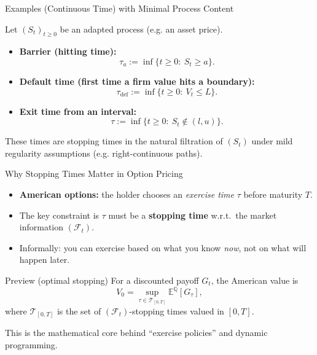 \documentclass[10pt,aspectratio=169]{beamer}
\begin{document}
\begin{frame}{Examples (Continuous Time) with Minimal Process Content}

Let \((S_t)_{t\ge 0}\) be an adapted process (e.g. an asset price).\pause

\begin{itemize}
  \item \textbf{Barrier (hitting time):}\pause
  \[
  \tau_a := \inf\{t\ge 0:\ S_t \ge a\}.
  \]
  \item \textbf{Default time (first time a firm value hits a boundary):}\pause
  \[
  \tau_{\text{def}} := \inf\{t\ge 0:\ V_t \le L\}.
  \]
  \item \textbf{Exit time from an interval:}\pause
  \[
  \tau := \inf\{t\ge 0:\ S_t \notin (l,u)\}.
  \]
\end{itemize}

\medskip
These times are stopping times in the natural filtration of \((S_t)\) under mild regularity assumptions (e.g. right-continuous paths).\pause

\end{frame}

\begin{frame}{Why Stopping Times Matter in Option Pricing}

\begin{itemize}
  \item \textbf{American options:}\pause
  the holder chooses an \emph{exercise time} \(\tau\) before maturity \(T\).\pause
  \item The key constraint is \(\tau\) must be a \textbf{stopping time} w.r.t.\ the market information \((\mathcal{F}_t)\).\pause
  \item Informally: you can exercise based on what you know \emph{now}, not on what will happen later.\pause
\end{itemize}

\medskip
\begin{block}{Preview (optimal stopping)}
For a discounted payoff \(G_t\), the American value is
\[
V_0 = \sup_{\tau \in \mathcal{T}_{[0,T]}}
\mathbb{E}^{\mathbb{Q}}\!\left[G_\tau\right],
\]
where \(\mathcal{T}_{[0,T]}\) is the set of \((\mathcal{F}_t)\)-stopping times valued in \([0,T]\).
\end{block}\pause

\medskip
This is the mathematical core behind ``exercise policies'' and dynamic programming.

\end{frame}
\end{document}
